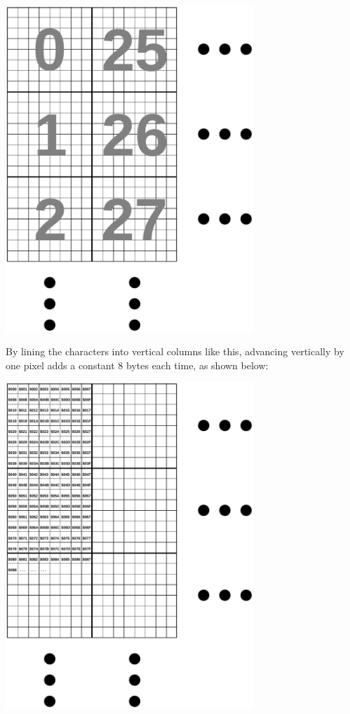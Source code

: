 \begin{center}
\includegraphics[width=0.7\textwidth]{images/illustrations/char-tile-grid-vertical-numbered}
\end{center}

By lining the characters into vertical columns like this, advancing vertically by one pixel adds a constant 8 bytes each time, as shown below:

\begin{center}
\includegraphics[width=0.7\textwidth]{images/illustrations/char-tile-grid-vertical-addressed}
\end{center}



